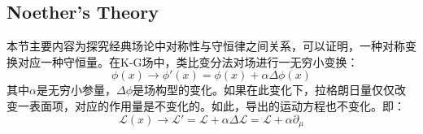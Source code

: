 \documentclass[../main.tex]{subfiles}
\begin{document}
\subsection{Noether's Theory}
    本节主要内容为探究经典场论中对称性与守恒律之间关系，可以证明，一种对称变换对应一种守恒量。在K-G场中，类比变分法对场进行一无穷小变换：
    \begin{equation}
        \phi(x) \rightarrow \phi'(x) = \phi(x) + \alpha \Delta \phi(x)
    \end{equation}
    其中$\alpha$是无穷小参量，$\Delta \phi$是场构型的变化。如果在此变化下，拉格朗日量仅仅改变一表面项，对应的作用量是不变化的。如此，导出的运动方程也不变化。即：
    \begin{equation}
        \mathcal{L}(x)\rightarrow \mathcal{L}' = \mathcal{L} + \alpha \Delta \mathcal{L} = \mathcal{L} + \alpha \partial_{\mu}
    \end{equation}
\end{document}
